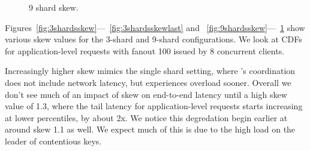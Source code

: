 \begin{figure}[tbp]
{  \label{fig:9shardsskewlast}
}
\caption{9 shard skew.}
\end{figure}


Figures~\ref{fig:3shardsskew}---~\ref{fig:3shardsskewlast} and
~\ref{fig:9shardsskew}---~\ref{fig:9shardsskewlast} show various skew values
for the 3-shard and 9-shard configurations. We look at CDFs for
application-level requests with fanout 100 issued by 8 concurrent clients.

Increasingly higher skew mimics the single shard setting, where \protocol's
coordination does not include network latency, but experiences overload sooner.
Overall we don't see much of an impact of skew on end-to-end latency until a
high skew value of 1.3, where the tail latency for application-level requests
starts increasing at lower percentiles, by about 2x. We notice this degredation
begin earlier at around skew 1.1 as well. We expect much of this is due to the
high load on the leader of contentious keys.

